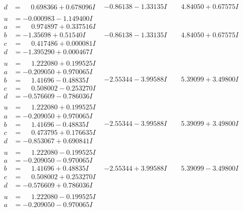 \documentclass[1p]{elsarticle_modified}
\theoremstyle{definition}
\begin{document}
$$\begin{array}{c|c|c}
\begin{aligned}
d &= \phantom{-}0.698366 + 0.678096 I\end{aligned}
 & -0.86138 - 1.33135 I & \phantom{-}4.84050 + 0.67575 I \\ \hline\begin{aligned}
u &= -0.000983 - 1.149400 I \\
a &= \phantom{-}0.974897 + 0.337516 I \\
b &= -1.35698 + 0.51540 I \\
c &= \phantom{-}0.417486 + 0.000081 I \\
d &= -1.395290 + 0.000467 I\end{aligned}
 & -0.86138 - 1.33135 I & \phantom{-}4.84050 + 0.67575 I \\ \hline\begin{aligned}
u &= \phantom{-}1.222080 + 0.199525 I \\
a &= -0.209050 + 0.970065 I \\
b &= \phantom{-}1.41696 - 0.48835 I \\
c &= \phantom{-}0.508002 - 0.253270 I \\
d &= -0.576609 - 0.786036 I\end{aligned}
 & -2.55344 - 3.99588 I & \phantom{-}5.39099 + 3.49800 I \\ \hline\begin{aligned}
u &= \phantom{-}1.222080 + 0.199525 I \\
a &= -0.209050 + 0.970065 I \\
b &= \phantom{-}1.41696 - 0.48835 I \\
c &= \phantom{-}0.473795 + 0.176635 I \\
d &= -0.853067 + 0.690841 I\end{aligned}
 & -2.55344 - 3.99588 I & \phantom{-}5.39099 + 3.49800 I \\ \hline\begin{aligned}
u &= \phantom{-}1.222080 - 0.199525 I \\
a &= -0.209050 - 0.970065 I \\
b &= \phantom{-}1.41696 + 0.48835 I \\
c &= \phantom{-}0.508002 + 0.253270 I \\
d &= -0.576609 + 0.786036 I\end{aligned}
 & -2.55344 + 3.99588 I & \phantom{-}5.39099 - 3.49800 I \\ \hline\begin{aligned}
u &= \phantom{-}1.222080 - 0.199525 I \\
a &= -0.209050 - 0.970065 I \\

\end{aligned}
\end{array}$$
\end{document}
